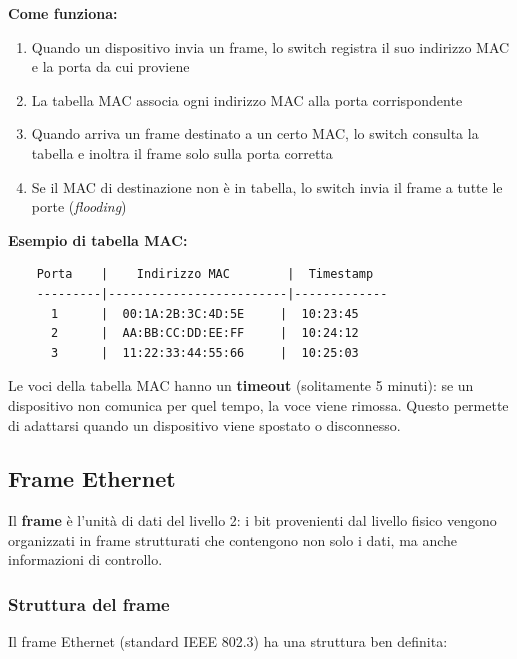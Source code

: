 \documentclass[12pt,a4paper]{article}
\begin{document}
\textbf{Come funziona:}
\begin{enumerate}
    \item Quando un dispositivo invia un frame, lo switch registra il suo indirizzo MAC e la porta da cui proviene
    \item La tabella MAC associa ogni indirizzo MAC alla porta corrispondente
    \item Quando arriva un frame destinato a un certo MAC, lo switch consulta la tabella e inoltra il frame solo sulla porta corretta
    \item Se il MAC di destinazione non è in tabella, lo switch invia il frame a tutte le porte (\textit{flooding})
\end{enumerate}

\textbf{Esempio di tabella MAC:}
\begin{verbatim}
    Porta    |    Indirizzo MAC        |  Timestamp
    ---------|-------------------------|-------------
      1      |  00:1A:2B:3C:4D:5E     |  10:23:45
      2      |  AA:BB:CC:DD:EE:FF     |  10:24:12
      3      |  11:22:33:44:55:66     |  10:25:03
\end{verbatim}

Le voci della tabella MAC hanno un \textbf{timeout} (solitamente 5 minuti): se un dispositivo non comunica per quel tempo, la voce viene rimossa. Questo permette di adattarsi quando un dispositivo viene spostato o disconnesso.

\subsection{Frame Ethernet}

Il \textbf{frame} è l'unità di dati del livello 2: i bit provenienti dal livello fisico vengono organizzati in frame strutturati che contengono non solo i dati, ma anche informazioni di controllo.

\subsubsection{Struttura del frame}

Il frame Ethernet (standard IEEE 802.3) ha una struttura ben definita:
\end{document}
